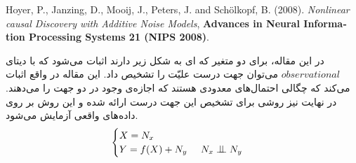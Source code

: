 \documentclass{article}
\begin{document}
\begin{enumerate}
	
\begin{latin}
Hoyer, P., Janzing, D., Mooij, J., Peters, J. and Sch{\"o}lkopf, B.  (2008).
\textit{Nonlinear causal Discovery with Additive Noise Models}, \textbf{Advances  in  Neural  Information  Processing  Systems 21 (NIPS 2008)}.
\end{latin}
در این مقاله، برای دو متغیر که ای به شکل زیر دارند اثبات می‌شود که با دیتای $observational$ می‌توان جهت درست علیّت را تشخیص داد.  این مقاله در واقع اثبات می‌کند که چگالی احتمال‌های معدودی هستند که اجازه‌ی وجود   در دو جهت را می‌دهند. در نهایت نیز روشی برای تشخیص این جهت درست ارائه شده و این روش بر روی داده‌های واقعی آزمایش می‌شود.
\begin{equation}
\begin{cases}
X = N_x \\
Y = f(X) + N_y \;\;\;\;\; N_x \bigCI N_y
\end{cases}
\end{equation}


\end{enumerate}
\end{document}
